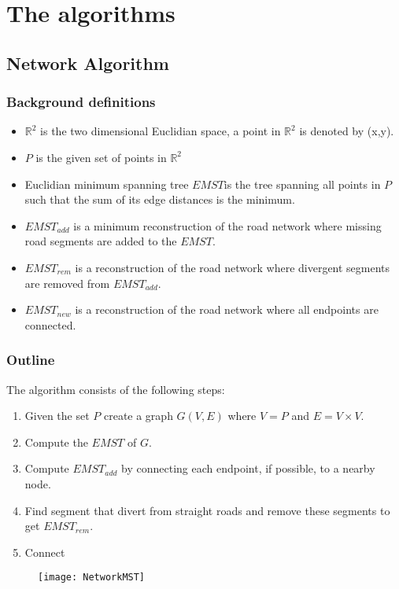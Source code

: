 \documentclass[11pt, twocolumn]{article}
\begin{document}
\section{The algorithms}
\label{se:algorithms}
\subsection{Network Algorithm}
\subsubsection{Background definitions}
\begin{itemize}
  \item $\mathbb{R}^2$ is the two dimensional Euclidian space, a point in $\mathbb{R}^2$ is denoted by (x,y).
  \item $P$ is the given set of points in $\mathbb{R}^2$
  \item Euclidian minimum spanning tree $EMST$is the tree spanning all points in $P$ such that the sum of its edge distances is the minimum.
  \item $EMST_{add}$ is a minimum reconstruction of the road network where missing road segments are added to the $EMST$.
  \item $EMST_{rem}$ is a reconstruction of the road network where divergent segments are removed from $EMST_{add}$.
  \item $EMST_{new}$ is a reconstruction of the road network where all endpoints are connected.
\end{itemize}
\subsubsection{Outline}

The algorithm consists of the following steps:
\begin{enumerate}
  \item Given the set $P$ create a graph $G(V,E)$ where $V=P$ and $E=V\times V$.
  \item Compute the $EMST$ of $G$.
  \item Compute $EMST_{add}$ by connecting each endpoint, if possible, to a nearby node.
  \item Find segment that divert from straight roads and remove these segments to get $EMST_{rem}$.
  \item Connect
\end{enumerate}
  \begin{figure}[h]
    \begin{center}
      \graphicspath{ {/home/chris/Documents/Github/Algorithms/report/images/}}
      \texttt{[image: NetworkMST]}
      \label{fig:}
      \caption{}
    \end{center}
  \end{figure}
\end{document}
